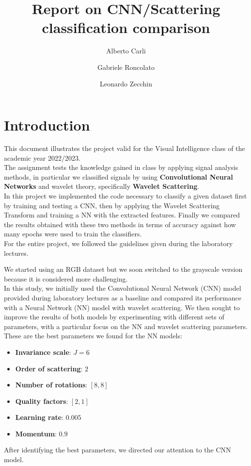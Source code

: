 \documentclass{report}
\title{Report on CNN/Scattering classification comparison}
\author{Alberto Carli \and Gabriele Roncolato \and Leonardo Zecchin }
\date{}
\begin{document}
\maketitle
\tableofcontents
\pagebreak

\chapter{Introduction}
This document illustrates the project valid for the Visual Intelligence class of the academic year 2022/2023. \\
The assignment tests the knowledge gained in class by applying signal analysis methods, in particular we classified signals by using \textbf{Convolutional Neural Networks} and wavelet theory, specifically  \textbf{Wavelet Scattering}. \\
In this project we implemented the code necessary to classify a given dataset first by training and testing a CNN, then by applying the Wavelet Scattering Transform and training a NN with the extracted features.
Finally we compared the results obtained with these two methods in terms of accuracy against how many epochs were used to train the classifiers. \\
For the entire project, we followed the guidelines given during the laboratory lectures.

We started using an RGB dataset but we soon switched to the grayscale version because it is considered more challenging.\\
In this study, we initially used the Convolutional Neural Network (CNN) model provided during laboratory
lectures as a baseline and compared its performance with a Neural Network (NN) model with wavelet scattering.
We then sought to improve the results of both models by experimenting with different sets of parameters, with a particular
focus on the NN and wavelet scattering parameters. \\
These are the best parameters we found for the NN models:
\begin{itemize}
  \item \textbf{Invariance scale}: $J=6$
  \item \textbf{Order of scattering}: $2$
  \item \textbf{Number of rotations}: $[8, 8]$
  \item \textbf{Quality factors}: $[2, 1]$
  \item \textbf{Learning rate}: $0.005$ 
  \item \textbf{Momentum}: $0.9$
\end{itemize}
After identifying the best parameters, we directed our attention to the CNN model.\\
\end{document}
